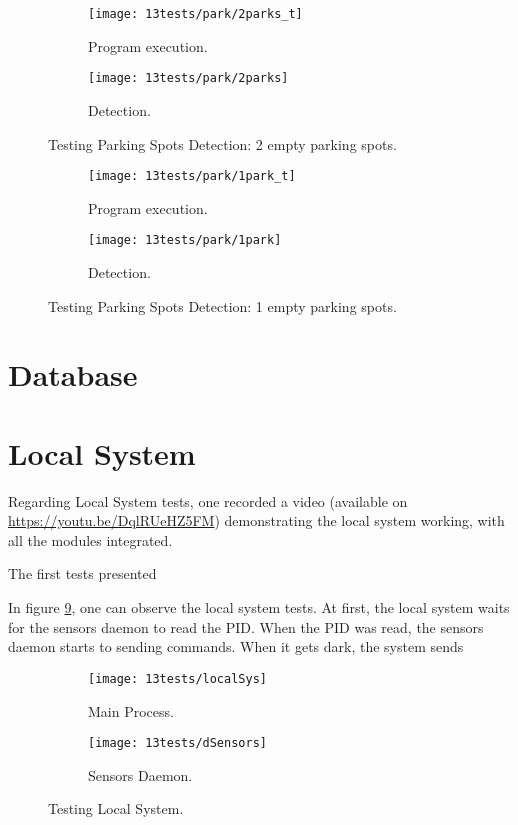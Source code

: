 \begin{figure}[H]
	\centering
	\begin{subfigure}{.5\textwidth}
		\centering
		\texttt{[image: 13tests/park/2parks\_t]}
		\caption{Program execution.}
		\label{fig:2parkst}
	\end{subfigure}%
	\begin{subfigure}{.4\textwidth}
		\centering
		\texttt{[image: 13tests/park/2parks]}
		\caption{Detection.}
		\label{fig:2parksim}
	\end{subfigure}
	\caption{Testing Parking Spots Detection: 2 empty parking spots.}
	\label{fig:2parks}
\end{figure}

\begin{figure}[H]
	\centering
	\begin{subfigure}{.5\textwidth}
		\centering
		\texttt{[image: 13tests/park/1park\_t]}
		\caption{Program execution.}
		\label{fig:1parkst}
	\end{subfigure}%
	\begin{subfigure}{.4\textwidth}
		\centering
		\texttt{[image: 13tests/park/1park]}
		\caption{Detection.}
		\label{fig:1parksim}
	\end{subfigure}
	\caption{Testing Parking Spots Detection: 1 empty parking spots.}
	\label{fig:1park}
\end{figure}

\section{Database}

\section{Local System}
Regarding Local System tests, one recorded a video (available on \url{https://youtu.be/DqlRUeHZ5FM}) demonstrating the local system working, with all the modules integrated.

The first tests presented

In figure \ref{fig:localSys}, one can observe the local system tests. At first, the local system waits for the sensors daemon to read the PID. When the PID was read, the sensors daemon starts to sending commands. When it gets dark, the system sends 

\begin{figure}[H]
	\centering
	\begin{subfigure}{.4\textwidth}
		\centering	
		\texttt{[image: 13tests/localSys]}
		\caption{Main Process.}
		\label{fig:main}
	\end{subfigure}%
	\begin{subfigure}{.4\textwidth}
		\centering
		\texttt{[image: 13tests/dSensors]}
		\caption{Sensors Daemon.}
		\label{fig:dSensors}
	\end{subfigure}
	\caption{Testing Local System.}
	\label{fig:localSys}
\end{figure}

